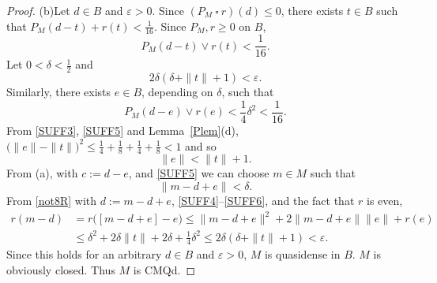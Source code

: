 \documentclass[letterpaper]{article}
\theoremstyle{plain}
\theoremstyle{definition}
\numberwithin{equation}{section}
\newcommand{\cmqd}{{CMQd}}
\newcommand{\eighth}{\ts\frac{1}{8}}
\newcommand{\eps}{\varepsilon}
\newcommand{\fourth}{\ts\frac{1}{4}}
\newcommand{\half}{{\textstyle\frac{1}{2}}}
\newcommand{\hexth}{{\textstyle\frac{1}{16}}}
\newcommand{\ssquare}{\ \square\ }
\newcommand{\ts}{\textstyle}
\newcommand{\Lem}{Lemma~\ref}
\newcommand{\Sec}{Section~\ref}
\begin{document}
\begin{proof}
(b)\enspace Let $d \in B$ and $\eps > 0$.   Since $(P_M \ssquare r)(d) \le 0$, there exists $t \in B$ such that $P_M(d - t) + r(t) < \hexth$.   Since $P_M, r \ge 0$ on $B$, 
%
\begin{equation}\label{SUFF3}
P_M(d - t) \vee r(t) < \hexth.
\end{equation}
Let $0 < \delta < \half$ and
\begin{equation}\label{SUFF4}
2\delta(\delta + \|t\| + 1) < \eps.
\end{equation}
%
Similarly, there exists $e \in B$, depending on $\delta$, such that
\begin{equation}\label{SUFF5}
P_M(d - e) \vee r(e) < \fourth\delta^2 < \hexth.
\end{equation}
%
From \eqref{SUFF3}, \eqref{SUFF5} and \Lem{Plem}(d), $\big(\|e\| - \|t\|\big)^2 \le \fourth + \eighth + \fourth + \eighth < 1$ and so 
\begin{equation}\label{SUFF7}
\|e\| < \|t\| + 1.
\end{equation}
%
From (a), with $c := d - e$, and \eqref{SUFF5} we can choose $m \in M$ such that
\begin{equation}\label{SUFF6}
\|m - d + e\| <  \delta. 
\end{equation}
%
From \eqref{not8R} with $d := m - d + e$, \eqref{SUFF4}--\eqref{SUFF6}, and the  fact that $r$ is even, 
\begin{align*}
r(m - d) &= r\big([m - d + e] - e\big) \le \|m - d + e\|^2 + 2\|m - d + e\|\|e\| + r(e)\\
&\le \delta^2 + 2\delta\|t\| + 2\delta + \fourth\delta^2 \le 2\delta(\delta + \|t\| + 1) < \eps.
\end{align*}
%
Since this holds for an arbitrary $d \in B$ and $\eps > 0$, $M$ is quasidense in $B$.   $M$ is obviously closed.   Thus $M$ is \cmqd.
\end{proof}
\end{document}
